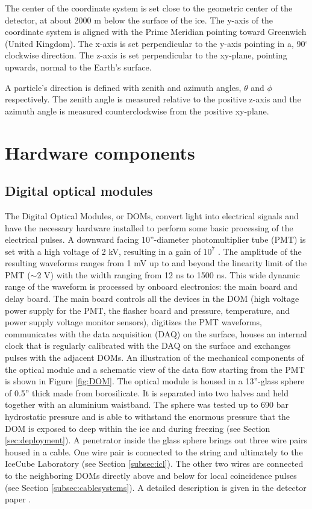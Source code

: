\noindent The center of the coordinate system is set close to the geometric center of the detector, at about 2000 m below the surface of the ice. The y-axis of the coordinate system is aligned with the Prime Meridian pointing toward Greenwich (United Kingdom). The x-axis is set perpendicular to the y-axis pointing in a, 90$^\circ$ clockwise direction. The z-axis is set perpendicular to the xy-plane, pointing upwards, normal to the Earth's surface.

A particle's direction is defined with zenith and azimuth angles, $\theta$ and $\phi$ respectively. The zenith angle is measured relative to the positive z-axis and the azimuth angle is measured counterclockwise from the positive xy-plane.



\section{Hardware components}
\subsection{Digital optical modules}
\label{subsec:doms}
The Digital Optical Modules, or DOMs, convert light into electrical signals and have the necessary hardware installed to perform some basic processing of the electrical pulses. A downward facing 10''-diameter photomultiplier tube (PMT) is set with a high voltage of 2 kV, resulting in a gain of $10^7$ \cite{Aartsen:2016nxy}. The amplitude of the resulting waveforms ranges from 1 mV up to and beyond the linearity limit of the PMT ($\sim$2 V) with the width ranging from 12 ns to 1500 ns. This wide dynamic range of the waveform is processed by onboard electronics: the main board and delay board. The main board controls all the devices in the DOM (high voltage power supply for the PMT, the flasher board and pressure, temperature, and power supply voltage monitor sensors), digitizes the PMT waveforms, communicates with the data acquisition (DAQ) on the surface, houses an internal clock that is regularly calibrated with the DAQ on the surface and exchanges pulses with the adjacent DOMs.
An illustration of the mechanical components of the optical module and a schematic view of the data flow starting from the PMT is shown in Figure \ref{fig:DOM}. The optical module is housed in a 13''-glass sphere of 0.5'' thick made from borosilicate. It is separated into two halves and held together with an aluminium waistband. The sphere was tested up to 690 bar hydrostatic pressure and is able to withstand the enormous pressure that the DOM is exposed to deep within the ice and during freezing (see Section \ref{sec:deployment}). A penetrator inside the glass sphere brings out three wire pairs housed in a cable. One wire pair is connected to the string and ultimately to the IceCube Laboratory (see Section \ref{subsec:icl}). The other two wires are connected to the neighboring DOMs directly above and below for local coincidence pulses (see Section \ref{subsec:cablesystems}). A detailed description is given in the detector paper \cite{Aartsen:2016nxy}.


